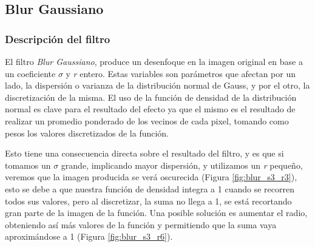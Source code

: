 \subsection{Blur Gaussiano}

\subsubsection{Descripción del filtro}

El filtro \textit{Blur Gaussiano}, produce un desenfoque en la imagen original
en base a un coeficiente $\sigma$ y \textit{r} entero. Estas variables son
parámetros que afectan por un lado, la dispersión o varianza de la distribución
normal de Gauss, y por el otro, la discretización de la misma. El uso de la
función de densidad de la distribución normal es clave para el resultado del
efecto ya que el mismo es el resultado de realizar un promedio ponderado de
los vecinos de cada pixel, tomando como pesos los valores discretizados de la
función.

Esto tiene una consecuencia directa sobre el resultado del filtro, y es que si
tomamos un $\sigma$ grande, implicando mayor dispersión, y utilizamos un
\textit{r} pequeño, veremos que la imagen producida se verá oscurecida (Figura \ref{fig:blur_s3_r3}), esto
se debe a que nuestra función de densidad integra a 1 cuando se recorren todos
sus valores, pero al discretizar, la suma no llega a 1, se está recortando gran
parte de la imagen de la función. Una posible solución es aumentar el radio,
obteniendo así más valores de la función y permitiendo que la suma vaya
aproximándose a 1 (Figura \ref{fig:blur_s3_r6}).


